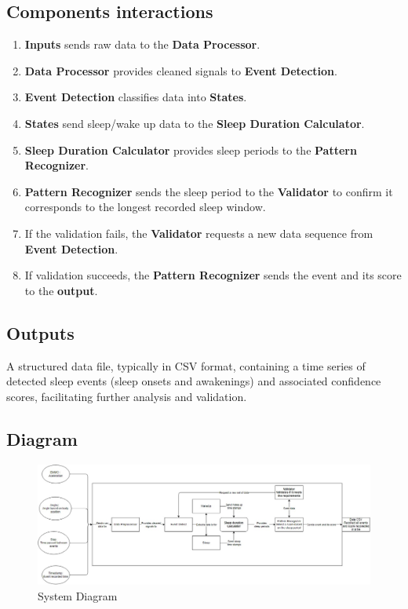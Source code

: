 \documentclass[conference]{IEEEtran}
\begin{document}
\subsection{Components interactions}
\begin{enumerate}
    \item \textbf{Inputs} sends raw data to the \textbf{Data Processor}.
    \item \textbf{Data Processor} provides cleaned signals to \textbf{Event Detection}.
    \item \textbf{Event Detection} classifies data into \textbf{States}.
    \item \textbf{States} send sleep/wake up data to the \textbf{Sleep Duration Calculator}.
    \item \textbf{Sleep Duration Calculator} provides sleep periods to the \textbf{Pattern Recognizer}.
    \item \textbf{Pattern Recognizer} sends the sleep period to the \textbf{Validator} to confirm it corresponds to the longest recorded sleep window.
    \item If the validation fails, the \textbf{Validator} requests a new data sequence from \textbf{Event Detection}.
    \item If validation succeeds, the \textbf{Pattern Recognizer} sends the event and its score to the \textbf{output}.
\end{enumerate}

\subsection{Outputs}
A structured data file, typically in CSV format, containing a time series of detected sleep events (sleep onsets and awakenings) and associated confidence scores, facilitating further analysis and validation.

\subsection{Diagram}
\begin{figure}[htbp]
    \centering
    \includegraphics[width=\linewidth]{Workshop-1.JPG}
    \caption{System Diagram}
\end{figure}
\end{document}
